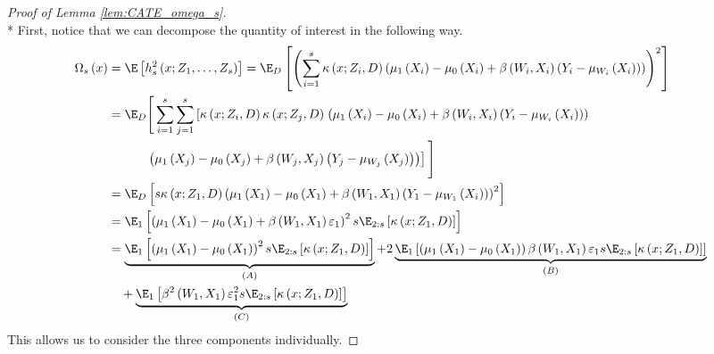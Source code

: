 \begin{proof}[Proof of Lemma \ref{lem:CATE_omega_s}]\mbox{}\\*
    First, notice that we can decompose the quantity of interest in the following way.
	\begin{equation}
		\begin{aligned}
			\Omega_{s}\left(x\right)
			 & = \E\left[h_{s}^{2}\left(x; Z_1, \ldots,  Z_{s}\right)\right]
             = \E_{D}\left[\left(\sum_{i = 1}^{s} \kappa\left(x; Z_{i}, D\right) \left(\mu_{1}\left(X_{i}\right) - \mu_{0}\left(X_{i}\right) + \beta\left(W_{i}, X_{i}\right)\left(Y_{i} - \mu_{W_{i}}\left(X_{i}\right)\right)\right)\right)^2\right]\\
             & = \E_{D}\Bigg[\sum_{i = 1}^{s}\sum_{j = 1}^{s}\left[\kappa\left(x; Z_{i}, D\right)\kappa\left(x; Z_j, D\right) \right.
             \left(\mu_{1}\left(X_{i}\right) - \mu_{0}\left(X_{i}\right) + \beta\left(W_{i}, X_{i}\right)\left(Y_{i} - \mu_{W_{i}}\left(X_{i}\right)\right)\right)\\
             & \quad \quad \quad \left. \left(\mu_{1}\left(X_j\right) - \mu_{0}\left(X_j\right) + \beta\left(W_j, X_j\right)\left(Y_{j} - \mu_{W_j}\left(X_j\right)\right)\right)
             \right]\Bigg] \\
             & = \E_{D}\left[s \kappa\left(x; Z_1, D\right) \left(\mu_{1}\left(X_1\right) - \mu_{0}\left(X_1\right) + \beta\left(W_{1}, X_1\right)\left(Y_{1} - \mu_{W_{1}}\left(X_{i}\right)\right)\right)^2\right]\\
             & = \E_{1}\left[\left(\mu_{1}\left(X_1\right) - \mu_{0}\left(X_1\right) + \beta\left(W_{1}, X_1\right)\varepsilon_1\right)^2 s \E_{2:s}\left[\kappa\left(x; Z_1, D\right)\right]\right]\\
             & = \underbrace{\E_{1}\left[\left(\mu_{1}\left(X_1\right) - \mu_{0}\left(X_1\right)\right)^2 s \E_{2:s}\left[\kappa\left(x; Z_1, D\right)\right]\right]}_{(A)}
             + 2 \underbrace{\E_{1}\left[\left(\mu_{1}\left(X_1\right) - \mu_{0}\left(X_1\right)\right)\beta\left(W_{1}, X_1\right)\varepsilon_1 s \E_{2:s}\left[\kappa\left(x; Z_1, D\right)\right]\right]}_{(B)}\\
             & \quad + \underbrace{\E_{1}\left[\beta^2\left(W_{1}, X_1\right)\varepsilon_1^2 s \E_{2:s}\left[\kappa\left(x; Z_1, D\right)\right]\right]}_{(C)}
		\end{aligned}
	\end{equation}
    This allows us to consider the three components individually.

\end{proof}
